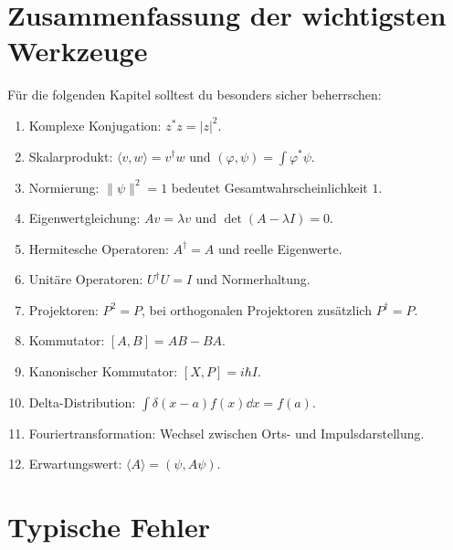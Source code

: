 \section{Zusammenfassung der wichtigsten Werkzeuge}

\begin{notebox}
Für die folgenden Kapitel solltest du besonders sicher beherrschen:
\begin{enumerate}[label=\arabic*)]
    \item Komplexe Konjugation: $z^*z=|z|^2$.
    \item Skalarprodukt: $\langle v,w\rangle=v^\dagger w$ und $(\varphi,\psi)=\int \varphi^*\psi$.
    \item Normierung: $\|\psi\|^2=1$ bedeutet Gesamtwahrscheinlichkeit $1$.
    \item Eigenwertgleichung: $Av=\lambda v$ und $\det(A-\lambda I)=0$.
    \item Hermitesche Operatoren: $A^\dagger=A$ und reelle Eigenwerte.
    \item Unitäre Operatoren: $U^\dagger U=I$ und Normerhaltung.
    \item Projektoren: $P^2=P$, bei orthogonalen Projektoren zusätzlich $P^\dagger=P$.
    \item Kommutator: $[A,B]=AB-BA$.
    \item Kanonischer Kommutator: $[X,P]=i\hbar I$.
    \item Delta-Distribution: $\int \delta(x-a)f(x)\dd x=f(a)$.
    \item Fouriertransformation: Wechsel zwischen Orts- und Impulsdarstellung.
    \item Erwartungswert: $\langle A\rangle=(\psi,A\psi)$.
\end{enumerate}
\end{notebox}

\section{Typische Fehler}

